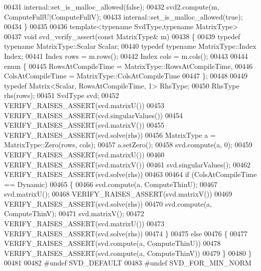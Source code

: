 \begin{DoxyCode}
00431   internal::set\_is\_malloc\_allowed(\textcolor{keyword}{false});
00432   svd2.compute(m, ComputeFullU|ComputeFullV);
00433   internal::set\_is\_malloc\_allowed(\textcolor{keyword}{true});
00434 \}
00435 
00436 \textcolor{keyword}{template}<\textcolor{keyword}{typename} SvdType,\textcolor{keyword}{typename} MatrixType> 
00437 \textcolor{keywordtype}{void} svd\_verify\_assert(\textcolor{keyword}{const} MatrixType& m)
00438 \{
00439   \textcolor{keyword}{typedef} \textcolor{keyword}{typename} MatrixType::Scalar Scalar;
00440   \textcolor{keyword}{typedef} \textcolor{keyword}{typename} MatrixType::Index Index;
00441   Index rows = m.rows();
00442   Index cols = m.cols();
00443 
00444   \textcolor{keyword}{enum} \{
00445     RowsAtCompileTime = MatrixType::RowsAtCompileTime,
00446     ColsAtCompileTime = MatrixType::ColsAtCompileTime
00447   \};
00448 
00449   \textcolor{keyword}{typedef} Matrix<Scalar, RowsAtCompileTime, 1> RhsType;
00450   RhsType rhs(rows);
00451   SvdType svd;
00452   VERIFY\_RAISES\_ASSERT(svd.matrixU())
00453   VERIFY\_RAISES\_ASSERT(svd.singularValues())
00454   VERIFY\_RAISES\_ASSERT(svd.matrixV())
00455   VERIFY\_RAISES\_ASSERT(svd.solve(rhs))
00456   MatrixType a = MatrixType::Zero(rows, cols);
00457   a.setZero();
00458   svd.compute(a, 0);
00459   VERIFY\_RAISES\_ASSERT(svd.matrixU())
00460   VERIFY\_RAISES\_ASSERT(svd.matrixV())
00461   svd.singularValues();
00462   VERIFY\_RAISES\_ASSERT(svd.solve(rhs))
00463     
00464   \textcolor{keywordflow}{if} (ColsAtCompileTime == Dynamic)
00465   \{
00466     svd.compute(a, ComputeThinU);
00467     svd.matrixU();
00468     VERIFY\_RAISES\_ASSERT(svd.matrixV())
00469     VERIFY\_RAISES\_ASSERT(svd.solve(rhs))
00470     svd.compute(a, ComputeThinV);
00471     svd.matrixV();
00472     VERIFY\_RAISES\_ASSERT(svd.matrixU())
00473     VERIFY\_RAISES\_ASSERT(svd.solve(rhs))
00474   \}
00475   \textcolor{keywordflow}{else}
00476   \{
00477     VERIFY\_RAISES\_ASSERT(svd.compute(a, ComputeThinU))
00478     VERIFY\_RAISES\_ASSERT(svd.compute(a, ComputeThinV))
00479   \}
00480 \}
00481 
00482 #undef SVD\_DEFAULT
00483 #undef SVD\_FOR\_MIN\_NORM
\end{DoxyCode}
